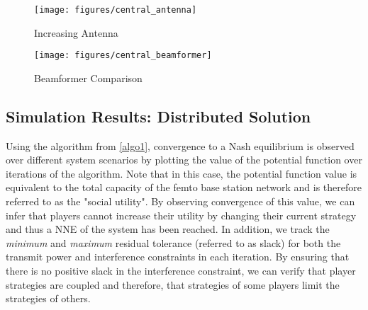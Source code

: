 \begin{figure}[H]
	\texttt{[image: figures/central\_antenna]}
	  \caption{Increasing Antenna}
	  \label{central_antenna}
\end{figure}
\begin{figure}[H]
	\texttt{[image: figures/central\_beamformer]}
	  \caption{Beamformer Comparison}
	  \label{central_beamformer}
\end{figure}

\subsection{Simulation Results: Distributed Solution}
Using the algorithm from \ref{algo1}, convergence to a Nash equilibrium is observed over different system scenarios by plotting the value of the potential function over iterations of the algorithm. Note that in this case, the potential function value is equivalent to the total capacity of the femto base station network and is therefore referred to as the "social utility". By observing convergence of this value, we can infer that players cannot increase their utility by changing their current strategy and thus a NNE of the system has been reached.  In addition, we track the \emph{minimum} and \emph{maximum} residual tolerance (referred to as slack) for both the transmit power and interference constraints in each iteration. By ensuring that there is no positive slack in the interference constraint, we can verify that player strategies are coupled and therefore, that strategies of some players limit the strategies of others. 
\par
